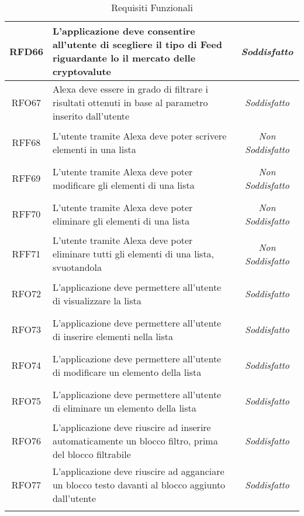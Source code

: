 \begin{longtable}{|c|>{\centering}m{7cm}|c|}
	\hypertarget{RFD66}{RFD66} & L'applicazione deve consentire all'utente di scegliere il tipo di Feed riguardante lo il mercato delle cryptovalute & \textit{Soddisfatto}\\ \hline
	
	\hypertarget{RFO67}{RFO67} & Alexa deve essere in grado di filtrare i risultati ottenuti in base al parametro inserito dall'utente & \textit{Soddisfatto}\\ \hline
	
	\hypertarget{RFF68}{RFF68} & L'utente tramite Alexa deve poter scrivere elementi in una lista & \textit{Non Soddisfatto}\\ \hline
	
	\hypertarget{RFF69}{RFF69} & L'utente tramite Alexa deve poter modificare gli elementi di una lista & \textit{Non Soddisfatto}\\ \hline
	
	\hypertarget{RFF70}{RFF70} & L'utente tramite Alexa deve poter eliminare gli elementi di una lista & \textit{Non Soddisfatto}\\ \hline
	
	\hypertarget{RFF71}{RFF71} & L'utente tramite Alexa deve poter eliminare tutti gli elementi di una lista, svuotandola & \textit{Non Soddisfatto}\\ \hline
	
	\hypertarget{RFO72}{RFO72} & L'applicazione deve permettere all'utente di visualizzare la lista & \textit{Soddisfatto}\\ \hline
	
	\hypertarget{RFO73}{RFO73} & L'applicazione deve permettere all'utente di inserire elementi nella lista & \textit{Soddisfatto}\\ \hline
	
	\hypertarget{RFO74}{RFO74} & L'applicazione deve permettere all'utente di modificare un elemento della lista & \textit{Soddisfatto}\\ \hline
	
	\hypertarget{RFO75}{RFO75} & L'applicazione deve permettere all'utente di eliminare un elemento della lista & \textit{Soddisfatto}\\ \hline
	
	\hypertarget{RFO76}{RFO76} & L'applicazione deve riuscire ad inserire automaticamente un blocco filtro, prima del blocco filtrabile & \textit{Soddisfatto}\\ \hline
	
	\hypertarget{RFO77}{RFO77} & L'applicazione deve riuscire ad agganciare un blocco testo davanti al blocco aggiunto dall'utente & \textit{Soddisfatto}\\ \hline
	
	\caption[Requisiti Funzionali]{Requisiti Funzionali}
	\label{tabella:req0}
\end{longtable}
\clearpage
